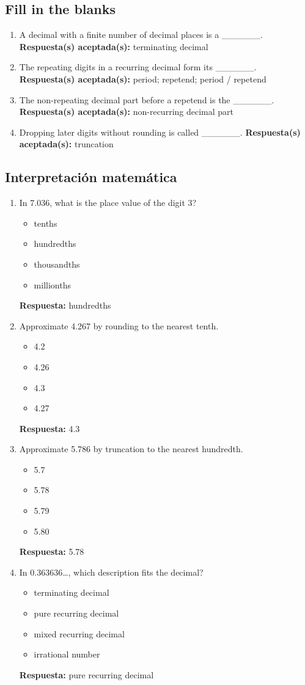 \documentclass[11pt,a4paper]{article}
\begin{document}
\subsection{Fill in the blanks}
\begin{enumerate}
\item A decimal with a finite number of decimal places is a \_\_\_\_\_\_.
\textbf{Respuesta(s) aceptada(s):} terminating decimal
\item The repeating digits in a recurring decimal form its \_\_\_\_\_\_.
\textbf{Respuesta(s) aceptada(s):} period; repetend; period / repetend
\item The non-repeating decimal part before a repetend is the \_\_\_\_\_\_.
\textbf{Respuesta(s) aceptada(s):} non-recurring decimal part
\item Dropping later digits without rounding is called \_\_\_\_\_\_.
\textbf{Respuesta(s) aceptada(s):} truncation
\end{enumerate}
\subsection{Interpretaci\'on matem\'atica}
\begin{enumerate}
\item In 7.036, what is the place value of the digit 3?
\begin{itemize}
\item tenths
\item hundredths
\item thousandths
\item millionths
\end{itemize}
\textbf{Respuesta:} hundredths
\item Approximate 4.267 by rounding to the nearest tenth.
\begin{itemize}
\item 4.2
\item 4.26
\item 4.3
\item 4.27
\end{itemize}
\textbf{Respuesta:} 4.3
\item Approximate 5.786 by truncation to the nearest hundredth.
\begin{itemize}
\item 5.7
\item 5.78
\item 5.79
\item 5.80
\end{itemize}
\textbf{Respuesta:} 5.78
\item In 0.363636\ldots , which description fits the decimal?
\begin{itemize}
\item terminating decimal
\item pure recurring decimal
\item mixed recurring decimal
\item irrational number
\end{itemize}
\textbf{Respuesta:} pure recurring decimal
\end{enumerate}
\end{document}
